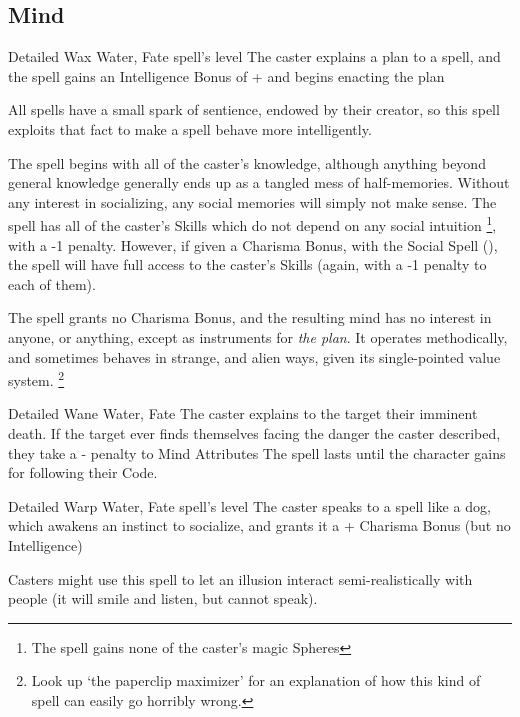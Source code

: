\begin{multicols}{2}
\subsection{Mind}

  {Detailed}%
  {Wax}%
  {Water, Fate}%
  {spell's level}%
  {The caster explains a plan to a spell, and the spell gains an Intelligence Bonus of + and begins enacting the plan}%
  {
  All spells have a small spark of sentience, endowed by their creator, so this spell exploits that fact to make a spell behave more intelligently.

  The spell begins with all of the caster's knowledge, although anything beyond general knowledge generally ends up as a tangled mess of half-memories.
  Without any interest in socializing, any social memories will simply not make sense.
  The spell has all of the caster's Skills which do not depend on any social intuition%
  \footnote{The spell gains none of the caster's magic Spheres},
  with a -1 penalty.
  However, if given a Charisma Bonus, with the Social Spell (), the spell will have full access to the caster's Skills (again, with a -1 penalty to each of them).

  The spell grants no Charisma Bonus, and the resulting mind has no interest in anyone, or anything, except as instruments for \emph{the plan}.
  It operates methodically, and sometimes behaves in strange, and alien ways, given its single-pointed value system.%
  \footnote{Look up `the paperclip maximizer' for an explanation of how this kind of spell can easily go horribly wrong.}
  }

\null
{}%
  {Detailed}%
  {Wane}%
  {Water, Fate}%
  {}%
  {The caster explains to the target their imminent death.
    If the target ever finds themselves facing the danger the caster described, they take a - penalty to Mind Attributes}%
  {The spell lasts until the character gains  for following their Code.}



\null
{}%
  {Detailed}%
  {Warp}%
  {Water, Fate}%
  {spell's level}%
  {The caster speaks to a spell like a dog, which awakens an instinct to socialize, and grants it a + Charisma Bonus (but no Intelligence)}%
  {
  Casters might use this spell to let an illusion interact semi-realistically with people (it will smile and listen, but cannot speak).

}
\end{multicols}
